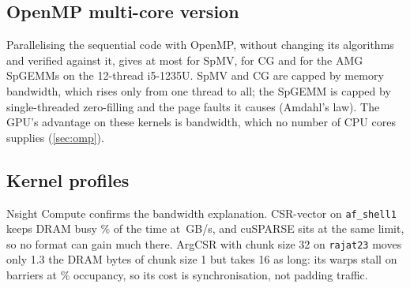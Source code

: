 \subsection{OpenMP multi-core version}\label{sec:res-omp}
Parallelising the sequential code with OpenMP, without changing its algorithms and verified against it, gives at most
\x{} for SpMV, \x{} for CG and \x{} for
the AMG SpGEMMs on the 12-thread i5-1235U. SpMV and CG are capped by memory bandwidth, which rises only
\x{} from one thread to all; the SpGEMM is capped by single-threaded zero-filling and the page faults
it causes (Amdahl's law). The GPU's advantage on these kernels is bandwidth, which no number of CPU cores supplies
(\cref{sec:omp}).

\subsection{Kernel profiles}\label{sec:res-ncu}
Nsight Compute confirms the bandwidth explanation. CSR-vector on \texttt{af\_shell1} keeps DRAM busy
\% of the time at \,GB/s, and
cuSPARSE sits at the same limit, so no format can gain much there. ArgCSR with chunk size 32 on \texttt{rajat23} moves
only 1.3\x{} the DRAM bytes of chunk size 1 but takes 16\x{} as long: its warps stall on barriers at
\% occupancy, so its cost is synchronisation, not padding traffic.

